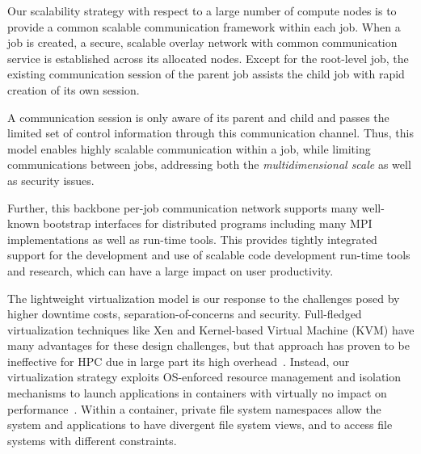 \vspace{1ex}
Our scalability strategy with respect to a large number 
of compute nodes is to provide a common scalable communication 
framework within each job. When a job is created, a secure, scalable 
overlay network with common communication service is established 
across its allocated nodes. Except for the root-level job, 
the existing communication session of the parent job assists 
the child job with rapid creation of its own session. 

A communication session is only aware of its parent 
and child and passes the limited set of control information 
through this communication channel. Thus, this model 
enables highly scalable communication within a job, while 
limiting communications between jobs, addressing 
both the {\em multidimensional scale} as well as security issues.

Further, this backbone per-job communication network 
supports many well-known bootstrap interfaces 
for distributed programs including many MPI implementations 
as well as run-time tools.  This provides tightly integrated support
for the development and use of scalable code development run-time tools
and research, which can have a large impact on user productivity.

\vspace{1ex}
 The lightweight 
virtualization model is our response to the challenges posed by
higher downtime costs, separation-of-concerns
and security. Full-fledged virtualization 
techniques like Xen and Kernel-based Virtual Machine (KVM) 
have many advantages for these design challenges, but 
that approach has proven to be ineffective for HPC 
due in large part its high overhead~\cite{VirtHPC}. 
Instead, our virtualization strategy exploits OS-enforced
resource management and isolation mechanisms 
to launch applications in containers with virtually 
no impact on performance~\cite{ContainerVirt}. Within a container, 
private file system namespaces allow the system 
and applications to have divergent file system views, 
and to access file systems with different constraints.
